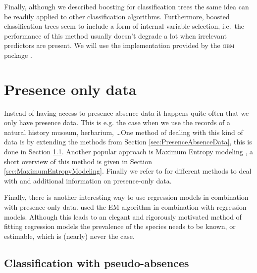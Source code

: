 Finally, although we described boosting for classification trees the same idea can be readily applied to other classification algorithms. Furthermore, boosted classification trees seem to include a form of internal variable selection, i.e.\ the performance of this method usually doesn't degrade a lot when irrelevant predictors are present. We will use the implementation provided by the \textsc{gbm} package \parencite{gbm}.

\section{Presence only data}
\label{sec:PresenceOnlyData}
Instead of having access to presence-absence data it happens quite often that we only have presence data. This is e.g. the case when we use the records of a natural history museum, herbarium, \dots One method of dealing with this kind of data is by extending the methods from Section \ref{sec:PresenceAbsenceData}, this is done in Section \ref{sec:ClassificationWithPseudoAbsences}. Another popular approach is Maximum Entropy modeling \parencite{phillips_maximum_2006,phillips_modeling_2008}, a short overview of this method is given in Section \ref{sec:MaximumEntropyModeling}. Finally we refer to \parencite{pearce_modelling_2006} for different methods to deal with and additional information on presence-only data. 

Finally, there is another interesting way to use regression models in combination with presence-only data. \cite{ward_presence-only_2009} used the EM algorithm \parencite{dempster_maximum_1977} in combination with regression models. Although this leads to an elegant and rigorously motivated method of fitting regression models the prevalence of the species needs to be known, or estimable, which is (nearly) never the case.

\subsection{Classification with pseudo-absences}
\label{sec:ClassificationWithPseudoAbsences}





